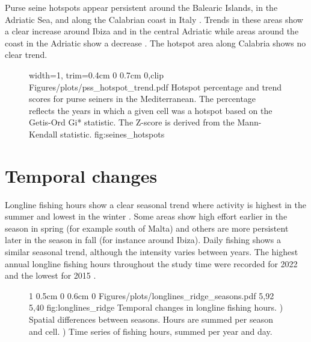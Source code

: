 Purse seine hotspots appear persistent around the Balearic Islands, in the Adriatic Sea, and along the Calabrian coast in Italy .
Trends in these areas show a clear increase around Ibiza and in the central Adriatic while areas around the coast in the Adriatic show a decrease .
The hotspot area along Calabria shows no clear trend.

\begin{figure}[h]
    {width=1\linewidth, trim=0.4cm 0 0.7cm 0,clip}
    {Figures/plots/pss_hotspot_trend.pdf}
    {%
    Hotspot percentage and trend scores for purse seiners in the Mediterranean.
    The percentage reflects the years in which a given cell was a hotspot based on the Getis-Ord Gi* statistic.
    The Z-score is derived from the Mann-Kendall statistic.}
    {fig:seines_hotspots}
\end{figure}

\FloatBarrier
\section{Temporal changes}
Longline fishing hours show a clear seasonal trend where activity is highest in the summer and lowest in the winter . Some areas show high
effort earlier in the season in spring (for example south of Malta) and others are more persistent later in the season in fall (for instance around Ibiza).
Daily fishing shows a similar seasonal trend, although the intensity varies between years. The highest annual longline fishing hours throughout the study time were recorded for 2022
and the lowest for 2015 .

\begin{figure}[htp]
    {1\linewidth}                           %
    {0.5cm 0 0.6cm 0}                       %
    {Figures/plots/longlines_ridge_seasons.pdf} %
    {5,92}                                  %
    {5,40}                                  %
    {fig:longlines_ridge}
    {%
    Temporal changes in longline fishing hours. ) Spatial differences between seasons. 
    Hours are summed per season and cell. ) Time series of fishing hours, summed per year 
    and day.}
\end{figure}

